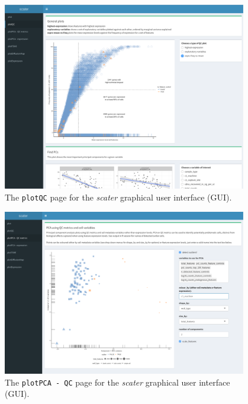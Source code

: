 \documentclass[10pt,letterpaper]{article}
\begin{document}
\begin{figure}[!tpb]
\centerline{\includegraphics[width=0.95\textwidth]{figures/scater_gui_plotqc.pdf}}
\caption{The \texttt{plotQC} page for the \emph{scater} graphical user interface (GUI).}\label{fig:scater-plotqc}
\end{figure}


\begin{figure}[!tpb]
\centerline{\includegraphics[width=0.95\textwidth]{figures/scater_gui_pca_qc.pdf}}
\caption{The \texttt{plotPCA - QC} page for the \emph{scater} graphical user interface (GUI).}\label{fig:scater-pca-qc}
\end{figure}

\clearpage

\nolinenumbers



%
%
%
%
%

\end{document}
